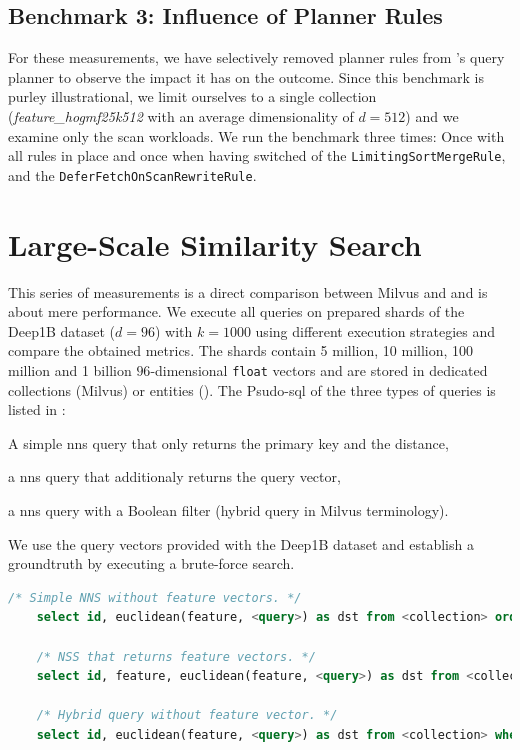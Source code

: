 \subsection{Benchmark 3: Influence of Planner Rules}

For these measurements, we have selectively removed planner rules from \cottontail's query planner to observe the impact it has on the outcome. Since this benchmark is purley illustrational, we limit ourselves to a single collection (\emph{feature\_hogmf25k512} with an average dimensionality of $d = 512$) and we examine only the scan workloads. We run the benchmark three times: Once with all rules in place and once when having switched of the \texttt{LimitingSortMergeRule}, and the \texttt{DeferFetchOnScanRewriteRule}.

\newpage

\section{Large-Scale Similarity Search}
This series of measurements is a direct comparison between Milvus and \cottontail{} and is about mere performance. We execute all queries on prepared shards of the Deep1B \cite{Babenko:2016Efficient} dataset ($d=96$) with $k=1000$ using different execution strategies and compare the obtained metrics. The shards contain 5 million, 10 million, 100 million and 1 billion $96$-dimensional \texttt{float} vectors and are stored in dedicated collections (Milvus) or entities (\cottontail). The Psudo-\acrshort{sql} of the three types of queries is listed in :
\begin{enumerate*}[label=(\roman*)]
    \item A simple \acrshort{nns} query that only returns the primary key and the distance,
    \item a \acrshort{nns} query that additionaly returns the query vector,
    \item a \acrshort{nns} query with a Boolean filter (hybrid query in Milvus terminology).
\end{enumerate*} We use the query vectors provided with the Deep1B dataset and establish a groundtruth by executing a brute-force search.

\begin{lstlisting}[language=SQL, caption={Pseudo-SQL of the queries executed for this measurement.}, label=listing:big_nns_query, numbers=none]
    /* Simple NNS without feature vectors. */
    select id, euclidean(feature, <query>) as dst from <collection> order by dst limit 1000
    
    /* NSS that returns feature vectors. */
    select id, feature, euclidean(feature, <query>) as dst from <collection> order by dst limit 1000

    /* Hybrid query without feature vector. */
    select id, euclidean(feature, <query>) as dst from <collection> where category = <category> order by dst limit 1000
\end{lstlisting}

